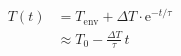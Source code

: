 \begin{equation}
    \begin{split}
        T(t) &= T_{\mathrm{env}} + \Delta T \cdot \mathrm{e}^{-t/\tau} \\
             &\approx T_0 - \frac{\Delta T}{\tau} \, t
    \end{split}
\end{equation}
